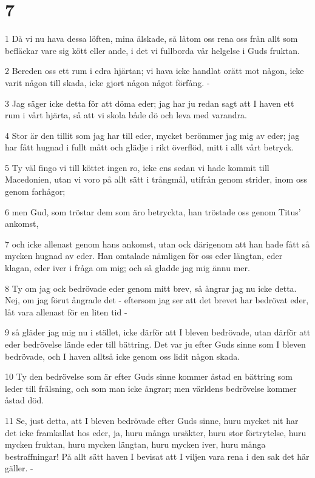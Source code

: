 \chapter{7}

\par 1 Då vi nu hava dessa löften, mina älskade, så låtom oss rena oss från allt som befläckar vare sig kött eller ande, i det vi fullborda vår helgelse i Guds fruktan.
\par 2 Bereden oss ett rum i edra hjärtan; vi hava icke handlat orätt mot någon, icke varit någon till skada, icke gjort någon något förfång. -
\par 3 Jag säger icke detta för att döma eder; jag har ju redan sagt att I haven ett rum i vårt hjärta, så att vi skola både dö och leva med varandra.
\par 4 Stor är den tillit som jag har till eder, mycket berömmer jag mig av eder; jag har fått hugnad i fullt mått och glädje i rikt överflöd, mitt i allt vårt betryck.
\par 5 Ty väl fingo vi till köttet ingen ro, icke ens sedan vi hade kommit till Macedonien, utan vi voro på allt sätt i trångmål, utifrån genom strider, inom oss genom farhågor;
\par 6 men Gud, som tröstar dem som äro betryckta, han tröstade oss genom Titus' ankomst,
\par 7 och icke allenast genom hans ankomst, utan ock därigenom att han hade fått så mycken hugnad av eder. Han omtalade nämligen för oss eder längtan, eder klagan, eder iver i fråga om mig; och så gladde jag mig ännu mer.
\par 8 Ty om jag ock bedrövade eder genom mitt brev, så ångrar jag nu icke detta. Nej, om jag förut ångrade det - eftersom jag ser att det brevet har bedrövat eder, låt vara allenast för en liten tid -
\par 9 så gläder jag mig nu i stället, icke därför att I bleven bedrövade, utan därför att eder bedrövelse lände eder till bättring. Det var ju efter Guds sinne som I bleven bedrövade, och I haven alltså icke genom oss lidit någon skada.
\par 10 Ty den bedrövelse som är efter Guds sinne kommer åstad en bättring som leder till frälsning, och som man icke ångrar; men världens bedrövelse kommer åstad död.
\par 11 Se, just detta, att I bleven bedrövade efter Guds sinne, huru mycket nit har det icke framkallat hos eder, ja, huru många ursäkter, huru stor förtrytelse, huru mycken fruktan, huru mycken längtan, huru mycken iver, huru många bestraffningar! På allt sätt haven I bevisat att I viljen vara rena i den sak det här gäller. -
